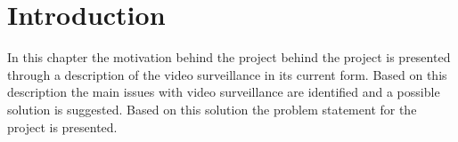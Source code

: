 \chapter{Introduction}
In this chapter the motivation behind the project behind the project is presented through a description of the video surveillance in its current form.
Based on this description the main issues with video surveillance are identified and a possible solution is suggested.
Based on this solution the problem statement for the project is presented.


%
